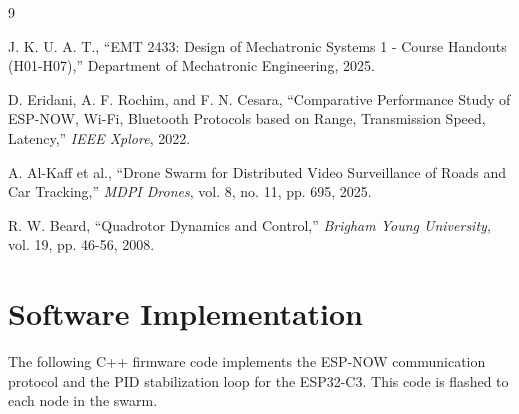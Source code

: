 \documentclass[12pt, a4paper]{article}
\begin{document}
\begin{thebibliography}{9}

J. K. U. A. T., ``EMT 2433: Design of Mechatronic Systems 1 - Course Handouts (H01-H07),'' Department of Mechatronic Engineering, 2025.

D. Eridani, A. F. Rochim, and F. N. Cesara, ``Comparative Performance Study of ESP-NOW, Wi-Fi, Bluetooth Protocols based on Range, Transmission Speed, Latency,'' \textit{IEEE Xplore}, 2022.

A. Al-Kaff et al., ``Drone Swarm for Distributed Video Surveillance of Roads and Car Tracking,'' \textit{MDPI Drones}, vol. 8, no. 11, pp. 695, 2025.

R. W. Beard, ``Quadrotor Dynamics and Control,'' \textit{Brigham Young University}, vol. 19, pp. 46-56, 2008.

\end{thebibliography}

\newpage

\appendix

\section{Software Implementation}
The following C++ firmware code implements the ESP-NOW communication protocol and the PID stabilization loop for the ESP32-C3. This code is flashed to each node in the swarm.
\end{document}
